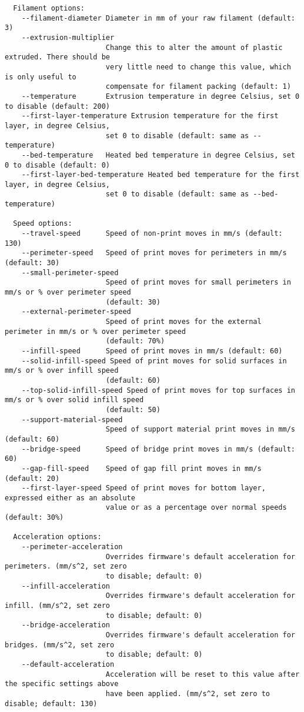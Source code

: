 \begin{verbatim}
  Filament options:
    --filament-diameter Diameter in mm of your raw filament (default: 3)
    --extrusion-multiplier
                        Change this to alter the amount of plastic extruded. There should be
                        very little need to change this value, which is only useful to
                        compensate for filament packing (default: 1)
    --temperature       Extrusion temperature in degree Celsius, set 0 to disable (default: 200)
    --first-layer-temperature Extrusion temperature for the first layer, in degree Celsius,
                        set 0 to disable (default: same as --temperature)
    --bed-temperature   Heated bed temperature in degree Celsius, set 0 to disable (default: 0)
    --first-layer-bed-temperature Heated bed temperature for the first layer, in degree Celsius,
                        set 0 to disable (default: same as --bed-temperature)

  Speed options:
    --travel-speed      Speed of non-print moves in mm/s (default: 130)
    --perimeter-speed   Speed of print moves for perimeters in mm/s (default: 30)
    --small-perimeter-speed
                        Speed of print moves for small perimeters in mm/s or % over perimeter speed
                        (default: 30)
    --external-perimeter-speed
                        Speed of print moves for the external perimeter in mm/s or % over perimeter speed
                        (default: 70%)
    --infill-speed      Speed of print moves in mm/s (default: 60)
    --solid-infill-speed Speed of print moves for solid surfaces in mm/s or % over infill speed
                        (default: 60)
    --top-solid-infill-speed Speed of print moves for top surfaces in mm/s or % over solid infill speed
                        (default: 50)
    --support-material-speed
                        Speed of support material print moves in mm/s (default: 60)
    --bridge-speed      Speed of bridge print moves in mm/s (default: 60)
    --gap-fill-speed    Speed of gap fill print moves in mm/s (default: 20)
    --first-layer-speed Speed of print moves for bottom layer, expressed either as an absolute
                        value or as a percentage over normal speeds (default: 30%)

  Acceleration options:
    --perimeter-acceleration
                        Overrides firmware's default acceleration for perimeters. (mm/s^2, set zero
                        to disable; default: 0)
    --infill-acceleration
                        Overrides firmware's default acceleration for infill. (mm/s^2, set zero
                        to disable; default: 0)
    --bridge-acceleration
                        Overrides firmware's default acceleration for bridges. (mm/s^2, set zero
                        to disable; default: 0)
    --default-acceleration
                        Acceleration will be reset to this value after the specific settings above
                        have been applied. (mm/s^2, set zero to disable; default: 130)


\end{verbatim}
